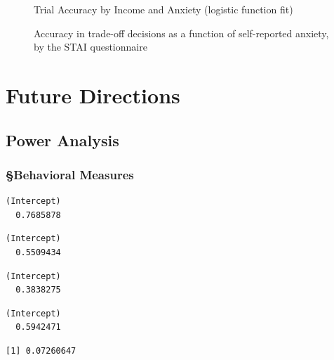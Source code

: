 \begin{figure}
\begin{minipage}[t]{0.50\linewidth}
{{}

\caption{Accuracy in trade-off decisions as a function of self-reported
anxiety, by the STAI questionnaire}

}

\end{minipage}%
\newline
\begin{minipage}[t]{0.50\linewidth}

{\centering 

Trial Accuracy by Income and Anxiety (logistic function fit)

}

\end{minipage}%

\end{figure}

\hypertarget{future-directions}{%
\section{Future Directions}\label{future-directions}}

\hypertarget{power-analysis}{%
\subsection{Power Analysis}\label{power-analysis}}

\hypertarget{behavioral-measures}{%
\subsubsection{§Behavioral Measures}\label{behavioral-measures}}

\begin{verbatim}
(Intercept) 
  0.7685878 
\end{verbatim}

\begin{verbatim}
(Intercept) 
  0.5509434 
\end{verbatim}

\begin{verbatim}
(Intercept) 
  0.3838275 
\end{verbatim}

\begin{verbatim}
(Intercept) 
  0.5942471 
\end{verbatim}

\begin{verbatim}
[1] 0.07260647
\end{verbatim}

